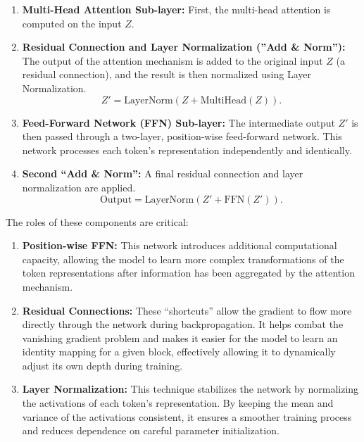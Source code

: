 \documentclass[%
  reprint,
  superscriptaddress,
  showpacs,
  showkeys,
  amsmath,amssymb,
  pra,
  longbibliography,
  floatfix,
  x11names
]{revtex4-2}
\begin{document}
\begin{enumerate}
    \item \textbf{Multi-Head Attention Sub-layer:} First, the multi-head attention is computed on the input $Z$.
    \item \textbf{Residual Connection and Layer Normalization (''Add \& Norm''):} The output of the attention mechanism is added to the original input $Z$ (a residual connection), and the result is then normalized using Layer Normalization.
    \begin{equation}
        Z' = \text{LayerNorm}(Z + \text{MultiHead}(Z)).
    \end{equation}
    \item \textbf{Feed-Forward Network (FFN) Sub-layer:} The intermediate output $Z'$ is then passed through a two-layer, position-wise feed-forward network. This network processes each token's representation independently and identically.
    \item \textbf{Second ``Add \& Norm'':} A final residual connection and layer normalization are applied.
    \begin{equation}
        \text{Output} = \text{LayerNorm}(Z' + \text{FFN}(Z')).
    \end{equation}
\end{enumerate}

The roles of these components are critical:
\begin{enumerate}
    \item \textbf{Position-wise FFN:} This network introduces additional computational capacity, allowing the model to learn more complex transformations of the token representations after information has been aggregated by the attention mechanism.
    \item \textbf{Residual Connections:} These ``shortcuts'' allow the gradient to flow more directly through the network during backpropagation. It helps combat the vanishing gradient problem and makes it easier for the model to learn an identity mapping for a given block, effectively allowing it to dynamically adjust its own depth during training.
    \item \textbf{Layer Normalization:} This technique stabilizes the network by normalizing the activations of each token's representation. By keeping the mean and variance of the activations consistent, it ensures a smoother training process and reduces dependence on careful parameter initialization.
\end{enumerate}
\end{document}
